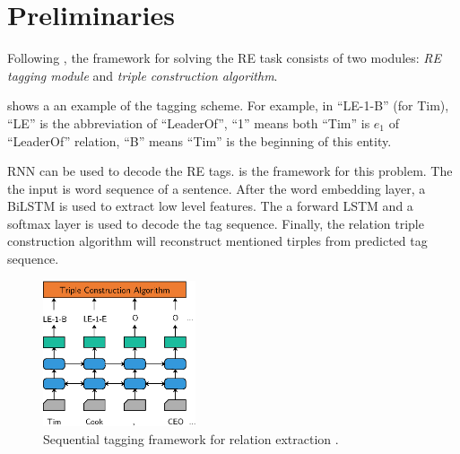\section{Preliminaries}

Following \cite{Zheng2017}, the framework for solving the RE task consists of two modules:
{\em RE tagging module} and {\em triple construction algorithm}.


 shows a an example of the tagging scheme. For example, in
``LE-1-B'' (for Tim),
``LE'' is the abbreviation of ``LeaderOf'', ``1'' means both ``Tim'' is  $e_1$
of ``LeaderOf'' relation, ``B'' means ``Tim'' is the beginning of this entity.


RNN can be used to decode the RE tags.  is the framework
for this problem. The the input is word sequence of a sentence. After the word
embedding layer, a BiLSTM is used to extract low level features. The a forward
LSTM and a softmax layer is used to decode the tag sequence. Finally, the
relation triple construction algorithm will reconstruct mentioned tirples from
predicted tag sequence.


\begin{figure}[h!]
\centering
\includegraphics[width=4.5cm]{pictures/model.eps}
\caption{Sequential tagging framework for relation extraction \cite{Zheng2017}. \label{fig:model}}
\end{figure}



